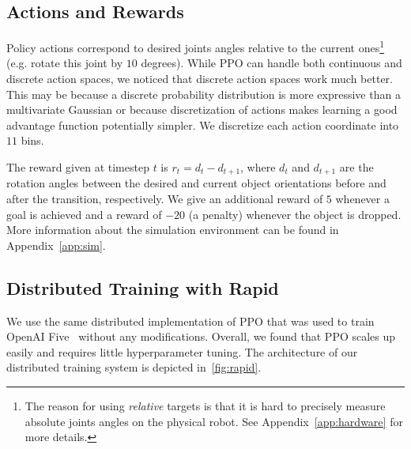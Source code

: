 \newcommand{\redis}[1]{
    \node[db,below=1.5cm of puller#1] (redis#1) {redis};
    \link{puller#1}{redis#1}{dashed}{parameters}{experience}
      
    \node[thread,below=1.5cm of redis#1] (w1) {worker};
    \node[thread,below right=0.1cm and 0.1cm of w1.north west] (w2) {worker};
    \node[thread,below right=0.1cm and 0.1cm of w2.north west] (w3) {worker};
    \node[thread,below right=0.1cm and 0.1cm of w3.north west] (w4) {worker};
    \node[thread,below right=0.1cm and 0.1cm of w4.north west] (w5) {worker};
    \link{redis#1}{w1}{dashed}{parameters}{experience}
      
}

\subsection{Actions and Rewards}

Policy actions correspond to desired joints angles relative to the current ones\footnote{The reason
for using \emph{relative} targets is that it is hard to precisely measure absolute joints angles
on the physical robot. See Appendix~\ref{app:hardware} for more details.}
(e.g. rotate this joint by $10$ degrees).
While PPO can handle both continuous and discrete action spaces, we noticed that
discrete action spaces work much better. This may be because a discrete probability distribution is more expressive than a multivariate Gaussian or because discretization of actions makes learning a good advantage function potentially simpler.
We discretize each action coordinate into $11$ bins.%

The reward given at timestep $t$ is $r_t=d_t-d_{t+1}$, where
$d_t$ and $d_{t+1}$ are the rotation angles between the desired 
and current object orientations before and after the transition, respectively.
We give an additional reward of $5$ whenever a goal is achieved and a reward of $-20$ (a penalty) whenever the object is dropped.
More information about the simulation environment
can be found in Appendix~\ref{app:sim}.


\subsection{Distributed Training with Rapid}
We use the same distributed implementation of PPO that was used to train OpenAI Five~\citep{five} without any modifications.
Overall, we found that PPO scales up easily and requires little hyperparameter tuning. %
The architecture of our distributed training system is depicted in~\autoref{fig:rapid}.

